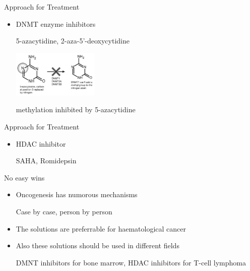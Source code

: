 \documentclass{beamer}
\begin{document}
    \begin{frame}{Approach for Treatment}
        \begin{itemize}
            \item DNMT enzyme inhibitors
            
                  {\small 5-azacytidine, 2-aza-5’-deoxycytidine}
                  
                  \vspace{2em}
                  \begin{center}
                    \includegraphics[height=6em]{5azcy-inh}
                    
                    {\footnotesize methylation inhibited by 5-azacytidine}
                  \end{center}
        \end{itemize}

    \end{frame}

    \begin{frame}{Approach for Treatment}
        \begin{itemize}
            \item HDAC inhibitor
                        
                  {\small SAHA, Romidepsin}

                  \vspace{2em}
                  \begin{center}
                    {\footnotesize }
                  \end{center}
        \end{itemize}
    \end{frame}

    \begin{frame}{No easy wins}
        \begin{itemize}
            \item Oncogenesis has numorous mechanisms
            
                  \vspace{0.5em}
                  {\footnotesize Case by case, person by person}
                  \vspace{0.5em}

            \item The solutions are preferrable for haematological cancer
            \item Also these solutions should be used in different fields
            
                  \vspace{0.5em}
                  {\footnotesize DMNT inhibitors for bone marrow, HDAC inhibitors for T-cell lymphoma}
                  \vspace{0.5em}
        \end{itemize}
    \end{frame}
\end{document}
